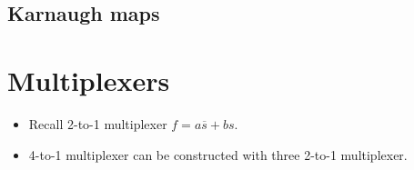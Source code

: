 \documentclass[a4paper, 10pt]{article}
\numberwithin{equation}{section}
\begin{document}
\subsection{Karnaugh maps}

\section{Multiplexers}
\begin{itemize}
    \item Recall 2-to-1 multiplexer $f=a\overline s+bs$.
    \item 4-to-1 multiplexer can be constructed with three 2-to-1 multiplexer. 
\end{itemize}
\end{document}
